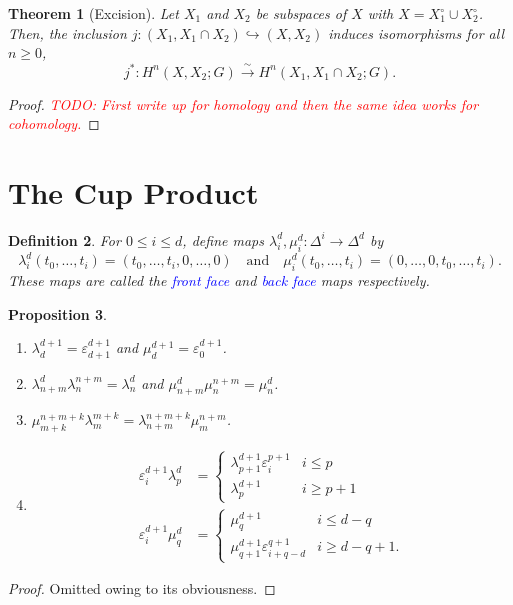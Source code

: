 \documentclass[10pt]{article}
\theoremstyle{thmstyle}
\newtheorem{theorem}{Theorem}[section]
\newtheorem{proposition}[theorem]{Proposition}
\theoremstyle{defstyle}
\newtheorem{definition}[theorem]{Definition}
\newcommand{\into}{\hookrightarrow}
\newcommand{\define}[1]{\textcolor{blue}{\textit{#1}}}
\newcommand{\important}[1]{\textcolor{red}{\textit{#1}}}
\renewcommand{\le}{\leqslant}
\renewcommand{\ge}{\geqslant}
\begin{document}
\begin{theorem}[Excision]
    Let $X_1$ and $X_2$ be subspaces of $X$ with $X = X_1^\circ\cup X_2^\circ$. Then, the inclusion $j: (X_1, X_1\cap X_2)\into (X, X_2)$ induces isomorphisms for all $n\ge 0$,
    \begin{equation*}
        j^\ast: H^n(X, X_2; G)\xrightarrow{\sim} H^n(X_1, X_1\cap X_2; G).
    \end{equation*}
\end{theorem}
\begin{proof}
    \important{TODO: First write up for homology and then the same idea works for cohomology.}
\end{proof}

\section{The Cup Product}

\begin{definition}
    For $0\le i\le d$, define maps $\lambda^d_i,\mu^d_i:\Delta^i\to\Delta^d$ by 
    \begin{equation*}
        \lambda_i^d(t_0,\dots, t_i) = (t_0,\dots,t_i,0,\dots,0)\quad\text{and}\quad\mu_i^d(t_0,\dots, t_i) = (0,\dots, 0, t_0,\dots, t_i).
    \end{equation*}
    These maps are called the \define{front face} and \define{back face} maps respectively.
\end{definition}

\begin{proposition}
    \begin{enumerate}[label=(\alph*)]
        \item $\lambda_d^{d + 1} = \varepsilon_{d + 1}^{d + 1}$ and $\mu_d^{d + 1} = \varepsilon_0^{d + 1}$.
        \item $\lambda^d_{n + m}\lambda^{n + m}_n = \lambda^d_n$ and $\mu^d_{n + m}\mu^{n + m}_n = \mu^d_n$.
        \item $\mu^{n + m + k}_{m + k}\lambda^{m + k}_m = \lambda^{n + m + k}_{n + m}\mu^{n + m}_m$.
        \item 
        \begin{align*}
            \varepsilon_i^{d + 1}\lambda^d_p &= 
            \begin{cases}
                \lambda^{d + 1}_{p + 1}\varepsilon^{p + 1}_i & i\le p\\
                \lambda^{d + 1}_p & i\ge p + 1
            \end{cases}\\
            \varepsilon_i^{d + 1}\mu^d_q &= 
            \begin{cases}
                \mu^{d + 1}_q & i\le d - q\\
                \mu^{d + 1}_{q + 1}\varepsilon^{q + 1}_{i + q - d} & i\ge d - q + 1.
            \end{cases}
        \end{align*}
    \end{enumerate}
\end{proposition}
\begin{proof}
    Omitted owing to its obviousness.
\end{proof}
\end{document}
